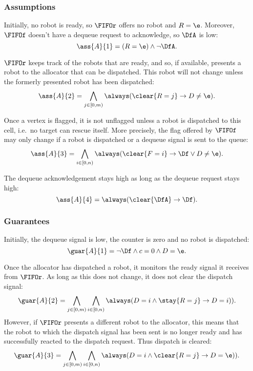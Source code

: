 \subsubsection{Assumptions}

Initially, no robot is ready, so $\FIFOr$ offers no robot and $R = \e$. Moreover, $\FIFOf$ doesn't have a dequeue request to acknowledge, so $\DfA$ is low:
\begin{equation*}
  \ass{A}{1} = (R=\e) \wedge \neg\DfA.
\end{equation*}

$\FIFOr$ keeps track of the robots that are ready, and so, if available, presents a robot to the allocator that can be dispatched. This robot will not change unless the formerly presented robot has been dispatched:
\begin{equation*}
    \ass{A}{2} = \bigwedge_{j \in [0, m)} \always(\clear{R=j} \rightarrow D\neq\e).
\end{equation*}

Once a vertex is flagged, it is not unflagged unless a robot is dispatched to this cell, i.e.\ no target can rescue itself. More precisely, the flag offered by $\FIFOf$ may only change if a robot is dispatched or a dequeue signal is sent to the queue:
\begin{equation*}
    \ass{A}{3} = \bigwedge_{i \in [0, n)} \always(\clear{F=i} \rightarrow \Df \vee D\neq\e).
\end{equation*}

The dequeue acknowledgement stays high as long as the dequeue request stays high:
\begin{equation*}
    \ass{A}{4} = \always(\clear{\DfA} \rightarrow \next\neg\Df).
\end{equation*}


\subsubsection{Guarantees}

Initially, the dequeue signal is low, the counter is zero and no robot is dispatched:
\begin{equation*}
    \guar{A}{1} = \neg\Df \wedge c=0 \wedge D=\e.
\end{equation*}

Once the allocator has dispatched a robot, it monitors the ready signal it receives from $\FIFOr$. As long as this does not change, it does not clear the dispatch signal:
\begin{equation*}
    \guar{A}{2} = \bigwedge_{j \in [0, m)} \bigwedge_{i \in [0, n)} \always(D=i \wedge \stay{R=j} \rightarrow \next(D=i)).
\end{equation*}
However, if $\FIFOr$ presents a different robot to the allocator, this means that the robot to which the dispatch signal has been sent is no longer ready and has successfully reacted to the dispatch request. Thus dispatch is cleared:
\begin{equation*}
    \guar{A}{3} = \bigwedge_{j \in [0, m)} \bigwedge_{i \in [0, n)} \always(D=i \wedge \clear{R=j} \rightarrow \next(D=\e)).
\end{equation*}

